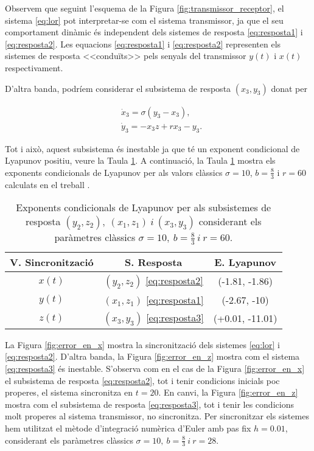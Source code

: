 \documentclass[11pt,a4paper,openright,oneside]{article}
\numberwithin{equation}{section}
\theoremstyle{definition}
\begin{document}
Observem que seguint l'esquema de la Figura \ref{fig:transmissor_receptor}, el sistema \eqref{eq:lor} pot interpretar-se com el sistema transmissor, ja que el seu comportament dinàmic és independent dels sistemes de resposta \eqref{eq:resposta1} i \eqref{eq:resposta2}. Les equacions \eqref{eq:resposta1} i \eqref{eq:resposta2} representen els sistemes de resposta <<conduïts>> pels senyals del transmissor $y(t)$ i $x(t)$ respectivament. 

D'altra banda, podríem considerar el subsistema de resposta $(x_3, y_3)$ donat per

\begin{equation} \begin{aligned} \label{eq:resposta3}
    &\dot{x}_3=\sigma(y_3 - x_3), \\ 
    &\dot{y}_3=-x_3z + rx_3 - y_3.
\end{aligned} \end{equation}

Tot i això, aquest subsistema és inestable ja que té un exponent condicional de Lyapunov positiu, veure la Taula \ref{tab:Exponents_Lypaunov}. A continuació, la Taula \ref{tab:Exponents_Lypaunov} mostra els exponents condicionals de Lyapunov per als valors clàssics $\sigma=10$, $b=\frac{8}{3}$ i $r=60$ calculats en el treball \cite{Alvarez}.

\begin{table}[htbp]
    \caption{Exponents condicionals de Lyapunov per als subsistemes de resposta $(y_2, z_2), \ (x_1, z_1) \ i \ (x_3, y_3)$ considerant els paràmetres clàssics $\sigma = 10, \ b = \frac{8}{3} \ i \ r=60$. }
    \centering
    \begin{tabular}{c|c|c}
        \hline
         V. Sincronització & S. Resposta & E. Lyapunov \\ \hline 
         $x(t)$ & $(y_2,z_2)$ \eqref{eq:resposta2} & (-1.81, -1.86) \\
         $y(t)$  & $(x_1,z_1)$ \eqref{eq:resposta1} & (-2.67, -10) \\
         $z(t)$ & $(x_3,y_3)$ \eqref{eq:resposta3} & (+0.01, -11.01) \\
    \end{tabular}
    
    \label{tab:Exponents_Lypaunov}
\end{table}

La Figura \ref{fig:error_en_x} mostra la sincronització dels sistemes \eqref{eq:lor} i \eqref{eq:resposta2}. D'altra banda, la Figura \ref{fig:error_en_z} mostra com el sistema \eqref{eq:resposta3} és inestable. S'observa com en el cas de la Figura \ref{fig:error_en_x} el subsistema de resposta \eqref{eq:resposta2}, tot i tenir condicions inicials poc properes, el sistema sincronitza en $t=20$. En canvi, la Figura \ref{fig:error_en_z} mostra com el subsistema de resposta \eqref{eq:resposta3}, tot i tenir les condicions molt properes al sistema transmissor, no sincronitza. Per sincronitzar els sistemes hem utilitzat el mètode d'integració numèrica d'Euler amb pas fix $h=0.01$, considerant els paràmetres clàssics $\sigma = 10, \ b=\frac{8}{3} \ i \ r=28$.
\end{document}
